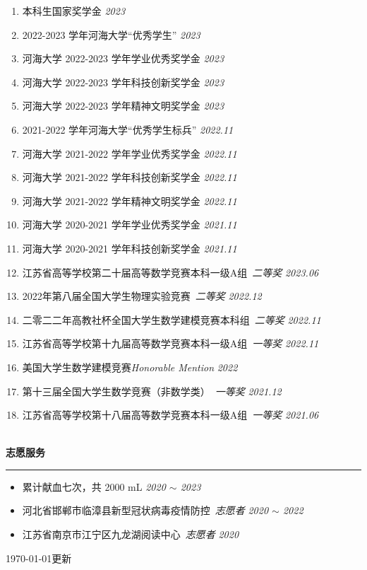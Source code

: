 \documentclass[12pt]{article}
\renewcommand*{\section}[1]{
    ~\\ \noindent \textbf{#1} \medskip \hrule \medskip
}
\begin{document}
\begin{enumerate}
    \item 本科生国家奖学金 \hfill \textit{2023}
    \item 2022-2023 学年河海大学“优秀学生” \hfill \textit{2023}
    \item 河海大学 2022-2023 学年学业优秀奖学金 \hfill \textit{2023}
    \item 河海大学 2022-2023 学年科技创新奖学金 \hfill \textit{2023}
    \item 河海大学 2022-2023 学年精神文明奖学金 \hfill \textit{2023}
    \item 2021-2022 学年河海大学“优秀学生标兵” \hfill \textit{2022.11}
    \item 河海大学 2021-2022 学年学业优秀奖学金 \hfill \textit{2022.11}
    \item 河海大学 2021-2022 学年科技创新奖学金 \hfill \textit{2022.11}
    \item 河海大学 2021-2022 学年精神文明奖学金 \hfill \textit{2022.11}
    \item 河海大学 2020-2021 学年学业优秀奖学金 \hfill \textit{2021.11}
    \item 河海大学 2020-2021 学年科技创新奖学金 \hfill \textit{2021.11}
          \\
    \item 江苏省高等学校第二十届高等数学竞赛本科一级A组\ \textit{二等奖} \hfill \textit{2023.06}
    \item 2022年第八届全国大学生物理实验竞赛\ \textit{二等奖} \hfill \textit{2022.12}
    \item 二零二二年高教社杯全国大学生数学建模竞赛本科组\ \textit{二等奖} \hfill \textit{2022.11}
    \item 江苏省高等学校第十九届高等数学竞赛本科一级A组\ \textit{一等奖} \hfill \textit{2022.11}
    \item 美国大学生数学建模竞赛\textit{Honorable Mention} \hfill \textit{2022}
    \item 第十三届全国大学生数学竞赛（非数学类）\ \textit{一等奖} \hfill \textit{2021.12}
    \item 江苏省高等学校第十八届高等数学竞赛本科一级A组\ \textit{一等奖} \hfill \textit{2021.06}
\end{enumerate}


\section{志愿服务}

\begin{itemize}
    \item 累计献血七次，共 2000 mL \hfill \textit{2020 $\sim$ 2023}
    \item 河北省邯郸市临漳县新型冠状病毒疫情防控\ \textit{志愿者} \hfill \textit{2020 $\sim$ 2022}
    \item 江苏省南京市江宁区九龙湖阅读中心\ \textit{志愿者} \hfill \textit{2020}
\end{itemize}

\hfill {\tiny \today 更新}
\end{document}
